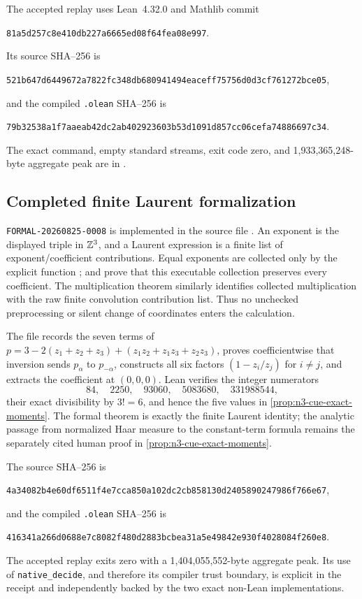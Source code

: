 The accepted replay uses Lean~4.32.0 and Mathlib commit
\begin{center}\small\texttt{81a5d257c8e410db227a6665ed08f64fea08e997}.\end{center}
Its source SHA--256 is
\begin{center}\small\texttt{521b647d6449672a7822fc348db680941494eaceff75756d0d3cf761272bce05},\end{center}
and the compiled \texttt{.olean} SHA--256 is
\begin{center}\small\texttt{79b32538a1f7aaeab42dc2ab402923603b53d1091d857cc06cefa74886697c34}.\end{center}
The exact command, empty standard streams, exit code zero, and 1,933,365,248-byte aggregate
peak are in .

\subsection{Completed finite Laurent formalization}

\texttt{FORMAL-20260825-0008} is implemented in the source file
.  An exponent is the
displayed triple in $\mathbb{Z}^3$, and a Laurent expression is a finite list of
exponent/coefficient contributions.  Equal exponents are collected only by the explicit
function ;  and
 prove that this executable collection preserves every
coefficient.  The multiplication theorem similarly identifies collected multiplication with
the raw finite convolution contribution list.  Thus no unchecked preprocessing or silent
change of coordinates enters the calculation.

The file records the seven terms of
$p=3-2(z_1+z_2+z_3)+(z_1z_2+z_1z_3+z_2z_3)$, proves coefficientwise that inversion sends
$p_\alpha$ to $p_{-\alpha}$, constructs all six factors
$(1-z_i/z_j)$ for $i\ne j$, and extracts the coefficient at $(0,0,0)$.  Lean verifies the
integer numerators
\[
 84,\quad2250,\quad93060,\quad5083680,\quad331988544,
\]
their exact divisibility by $3!=6$, and hence the five values in
\cref{prop:n3-cue-exact-moments}.  The formal theorem is exactly the finite Laurent identity;
the analytic passage from normalized Haar measure to the constant-term formula remains the
separately cited human proof in \cref{prop:n3-cue-exact-moments}.

The source SHA--256 is
\begin{center}\small\texttt{4a34082b4e60df6511f4e7cca850a102dc2cb858130d2405890247986f766e67},\end{center}
and the compiled \texttt{.olean} SHA--256 is
\begin{center}\small\texttt{416341a266d0688e7c8082f480d2883bcbea31a5e49842e930f4028084f260e8}.\end{center}
The accepted replay exits zero with a 1,404,055,552-byte aggregate peak.  Its use of
\texttt{native\_decide}, and therefore its compiler trust boundary, is explicit in the receipt
and independently backed by the two exact non-Lean implementations.

